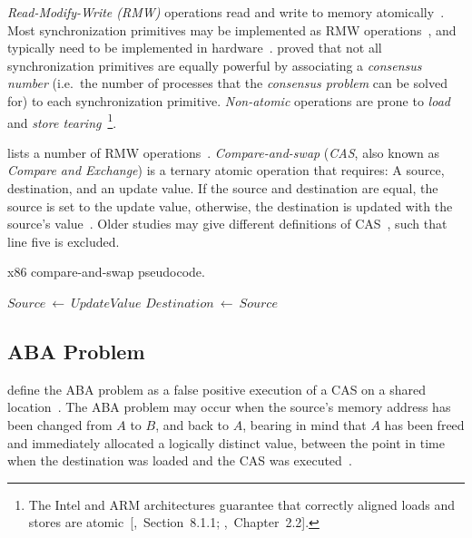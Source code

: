 \emph{Read-Modify-Write (RMW)} operations read and write to memory
atomically~\citep{perfbook2021}. Most synchronization primitives may be
implemented as RMW operations~\citep[Section~5.6]{herlihy2020art}, and
typically need to be implemented in hardware~\citep[Appendix~B.8]{herlihy2020art}.
\citeauthor{herlihy1991wait} proved that not all synchronization primitives are
equally powerful by associating a \emph{consensus number} (i.e.~the number of
processes that the \emph{consensus problem} can be solved for) to each
synchronization primitive. \emph{Non-atomic} operations are prone to \emph{load} and \emph{store
tearing}~\citep[Section~4.3.4]{perfbook2021}\footnote{The Intel and ARM
architectures guarantee that correctly aligned loads and stores are
atomic~[\citealp{intel2021system},~Section~8.1.1;
\citealp{arm2022architecture},~Chapter~2.2].}.

\citeauthor{scott2013shared} lists a number of RMW operations~\citep[Table~2.2]{scott2013shared}.
\emph{Compare-and-swap} (\emph{CAS}, also known as \emph{Compare and Exchange})
is a ternary atomic operation that requires: A source, destination, and an
update value. If the source and destination are equal, the source is set to the
update value, otherwise, the destination is updated with the source's
value~\citep{intel2021inst}.
Older studies may give different definitions of
CAS~\citetext{\citealp{scott2013shared},~Table~2.2;~\citealp{valois1995datastructures},~Appendix~A},
such that line five is excluded.

\SetNoFillComment
{}
\begin{algorithm}[hbt!]
    \caption{x86 compare-and-swap pseudocode.}\label{alg:cas}
        {
            $Source~\gets~UpdateValue$\;
            \;
        }
        $Destination~\gets~Source$\label{alg:line:sourceneqdest}\;
        \;
\end{algorithm}


\subsection{ABA Problem}
\citeauthor{dechev2010understanding} define the ABA problem as a false positive
execution of a CAS on a shared location~\citep{dechev2010understanding}. The ABA
problem may occur when the source's memory address has been changed from $A$ to
$B$, and back to $A$, bearing in mind that $A$ has been freed and immediately
allocated a logically distinct value, between the point in time when the
destination was loaded and the CAS was executed~\citep{dechev2010understanding}.

